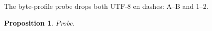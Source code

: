 \documentclass{article}
\newtheorem{proposition}[theorem]{Proposition}
\begin{document}
The byte-profile probe drops both UTF-8 en dashes: A–B and 1–2.
\begin{proposition}Probe.\end{proposition}
\end{document}
